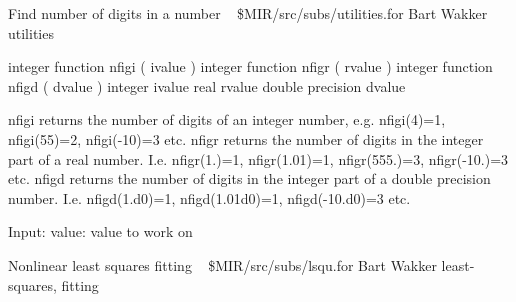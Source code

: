 %
\noindent Find number of digits in a number
\newline \ 
\newline {} \$MIR/src/subs/utilities.for
\newline {} Bart Wakker
\newline {} utilities
\par{\tenpoint
{\eightpoint\begintt
      integer          function nfigi ( ivalue )
      integer          function nfigr ( rvalue )
      integer          function nfigd ( dvalue )
      integer          ivalue
      real             rvalue
      double precision dvalue

 nfigi returns the number of digits of an integer number, e.g. nfigi(4)=1,
 nfigi(55)=2, nfigi(-10)=3 etc.
 nfigr returns the number of digits in the integer part of a real number. I.e.
 nfigr(1.)=1, nfigr(1.01)=1, nfigr(555.)=3, nfigr(-10.)=3 etc.
 nfigd returns the number of digits in the integer part of a double precision
 number. I.e. nfigd(1.d0)=1, nfigd(1.01d0)=1, nfigd(-10.d0)=3 etc.

 Input:
   value:     value to work on
\endtt}
\par}
%
\noindent Nonlinear least squares fitting
\newline \ 
\newline {} \$MIR/src/subs/lsqu.for
\newline {} Bart Wakker
\newline \abox{Keywords:} least-squares, fitting
